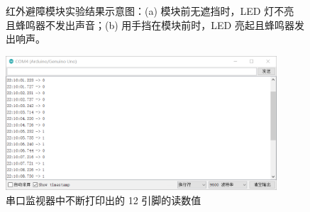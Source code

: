 \documentclass[UTF8, oneside]{ctexbook}
\begin{document}
\begin{figure}[h]
    \centering


    \centering
    \caption{红外避障模块实验结果示意图：(a) 模块前无遮挡时，LED 灯不亮
    且蜂鸣器不发出声音；(b) 用手挡在模块前时，LED 亮起且蜂鸣器发出响声。}
    \label{s13_1}
    
\end{figure}

\begin{figure}[h]
    \centering
    \includegraphics[width=0.9\textwidth]{./result/sensor/13/result1.png}
    \caption{串口监视器中不断打印出的 12 引脚的读数值}
    \label{s13_2}
\end{figure}
\end{document}
